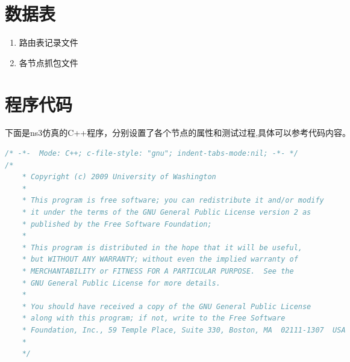\documentclass[a4paper,12pt]{report}
\begin{document}
\lstset{breaklines}                %
\lstset{extendedchars=false}
\lstset{language=Matlab}
\renewcommand{\thechapter}{附录\Alph{chapter}.} 
\appendix
\begin{appendix}
	
	
\chapter{数据表}
\songti
\begin{spacing}{1.5}
\begin{enumerate}
\item 路由表记录文件
\item 各节点抓包文件
\end{enumerate}
\end{spacing}


\chapter{程序代码}
\songti
\begin{spacing}{1.5}
下面是ns3仿真的C++程序，分别设置了各个节点的属性和测试过程,具体可以参考代码内容。
\begin{lstlisting}[language=c++]
/* -*-  Mode: C++; c-file-style: "gnu"; indent-tabs-mode:nil; -*- */
/*
	* Copyright (c) 2009 University of Washington
	*
	* This program is free software; you can redistribute it and/or modify
	* it under the terms of the GNU General Public License version 2 as
	* published by the Free Software Foundation;
	*
	* This program is distributed in the hope that it will be useful,
	* but WITHOUT ANY WARRANTY; without even the implied warranty of
	* MERCHANTABILITY or FITNESS FOR A PARTICULAR PURPOSE.  See the
	* GNU General Public License for more details.
	*
	* You should have received a copy of the GNU General Public License
	* along with this program; if not, write to the Free Software
	* Foundation, Inc., 59 Temple Place, Suite 330, Boston, MA  02111-1307  USA
	*
	*/


\end{lstlisting}
\end{spacing}
\end{appendix}
\end{document}
